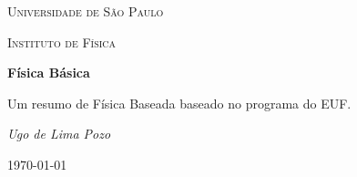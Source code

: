 \begin{titlepage}

    \centering
    {\scshape\LARGE Universidade de São Paulo \par}
    \vspace{1cm}
    {\scshape\Large Instituto de Física\par}
    \vspace{1.5cm}
    {\huge\bfseries Física Básica\par}
    \vspace{2cm}
    {\Large Um resumo de Física Baseada baseado no programa do EUF.\par}
    \vfill
    {\Large\itshape Ugo de Lima Pozo \par}

    \vfill
    {\large \today\par}

\end{titlepage}